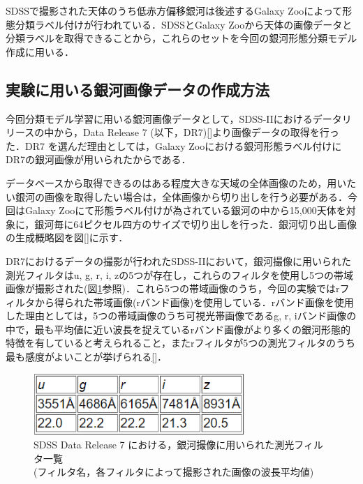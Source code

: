 \documentclass[a4j, 11pt]{jreport}
\begin{document}
SDSSで撮影された天体のうち低赤方偏移銀河は後述するGalaxy Zooによって形態分類ラベル付けが行われている．SDSSとGalaxy Zooから天体の画像データと分類ラベルを取得できることから，これらのセットを今回の銀河形態分類モデル作成に用いる．
\subsection*{実験に用いる銀河画像データの作成方法}
今回分類モデル学習に用いる銀河画像データとして，SDSS-IIにおけるデータリリースの中から，Data Release 7 (以下，DR7)\ref{}より画像データの取得を行った．DR7 を選んだ理由としては，Galaxy Zooにおける銀河形態ラベル付けにDR7の銀河画像が用いられたからである．

データベースから取得できるのはある程度大きな天域の全体画像のため，用いたい銀河の画像を取得したい場合は，全体画像から切り出しを行う必要がある．今回はGalaxy Zooにて形態ラベル付けが為されている銀河の中から15,000天体を対象に，銀河毎に64ピクセル四方のサイズで切り出しを行った．銀河切り出し画像の生成概略図を図\ref{}に示す．

DR7におけるデータの撮影が行われたSDSS-IIにおいて，銀河撮像に用いられた測光フィルタはu, g, r, i, zの5つが存在し，これらのフィルタを使用し5つの帯域画像が撮影された(図\ref{fig:dr7_filters}参照)．これら5つの帯域画像のうち，今回の実験ではrフィルタから得られた帯域画像(rバンド画像)を使用している．rバンド画像を使用した理由としては，5つの帯域画像のうち可視光帯画像であるg, r, iバンド画像の中で，最も平均値に近い波長を捉えているrバンド画像がより多くの銀河形態的特徴を有していると考えられること，またrフィルタが5つの測光フィルタのうち最も感度がよいことが挙げられる\ref{}．

\begin{figure}[H]
	\centering
	\includegraphics[width=8cm]{images/dr7_filters.png}
	\caption{SDSS Data Release 7 における，銀河撮像に用いられた測光フィルタ一覧\\(フィルタ名，各フィルタによって撮影された画像の波長平均値)}
	\label{fig:dr7_filters}
\end{figure}
\end{document}
